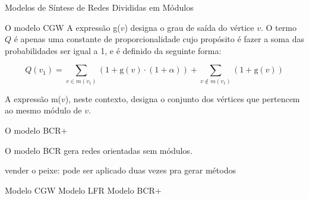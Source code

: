 \begin{section}{Modelos de Síntese de Redes Divididas em Módulos}
\begin{subsection}{O modelo CGW}
A expressão g($v$) designa o grau de saída do vértice $v$. O termo $Q$ é apenas uma constante de proporcionalidade cujo propósito é fazer a soma das probabilidades ser igual a 1, e é definido da seguinte forma:

$$
Q(v_1) = \sum_{v \in m(v_1)} (1 + \mathrm{g}(v) \cdot (1 + \alpha))
+ \sum_{v \notin m(v_1)} (1 + \mathrm{g}(v))
$$

A expressão m($v$), neste contexto, designa o conjunto dos vértices que pertencem ao mesmo módulo de $v$.

\end{subsection}

\begin{subsection}{O modelo BCR+}

O modelo BCR \cite{Bollobas2003} gera redes orientadas sem módulos. 

vender o peixe: pode ser aplicado duas vezes pra gerar métodos
\end{subsection}

Modelo CGW
Modelo LFR
Modelo BCR+ 

\end{section}